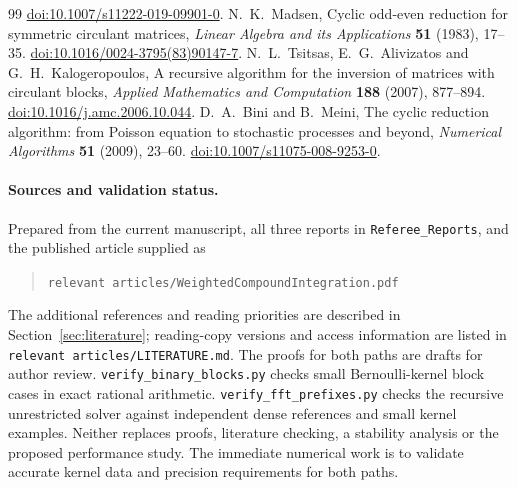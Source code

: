 \documentclass[11pt]{article}
\begin{document}
\begin{thebibliography}{99}
\href{https://doi.org/10.1007/s11222-019-09901-0}{doi:10.1007/s11222-019-09901-0}.
N.\ K.\ Madsen,
Cyclic odd-even reduction for symmetric circulant matrices,
\emph{Linear Algebra and its Applications} \textbf{51} (1983), 17--35.
\href{https://doi.org/10.1016/0024-3795(83)90147-7}{doi:10.1016/0024-3795(83)90147-7}.
N.\ L.\ Tsitsas, E.\ G.\ Alivizatos and G.\ H.\ Kalogeropoulos,
A recursive algorithm for the inversion of matrices with circulant blocks,
\emph{Applied Mathematics and Computation} \textbf{188} (2007), 877--894.
\href{https://doi.org/10.1016/j.amc.2006.10.044}{doi:10.1016/j.amc.2006.10.044}.
D.\ A.\ Bini and B.\ Meini,
The cyclic reduction algorithm: from Poisson equation to stochastic
processes and beyond,
\emph{Numerical Algorithms} \textbf{51} (2009), 23--60.
\href{https://doi.org/10.1007/s11075-008-9253-0}{doi:10.1007/s11075-008-9253-0}.
\end{thebibliography}
\paragraph{Sources and validation status.}
Prepared from the current manuscript, all three reports in
\texttt{Referee\_Reports}, and the published article supplied as
\begin{quote}\small\texttt{relevant articles/WeightedCompoundIntegration.pdf}\end{quote}
The additional references and reading priorities are described in
Section~\ref{sec:literature}; reading-copy versions and access information
are listed in \texttt{relevant articles/LITERATURE.md}.
The proofs for both paths are drafts for author review.
\texttt{verify\_binary\_blocks.py} checks small Bernoulli-kernel
block cases in exact rational arithmetic.
\texttt{verify\_fft\_prefixes.py} checks the recursive unrestricted
solver against independent dense references and small kernel examples.
Neither replaces proofs, literature checking, a stability analysis or
the proposed performance study. The immediate numerical work is to
validate accurate kernel data and precision requirements for both paths.
\end{document}
